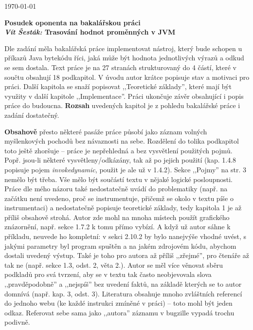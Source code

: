 \documentclass{article}
\begin{document}
\begin{flushright}
\today
\end{flushright}
\begin{center}
\Large\textbf{Posudek oponenta na bakalářskou práci \\
\normalsize%
\textit{Vít Šesták:} Trasování hodnot proměnných v JVM}
\end{center}

Dle zadání měla bakalářská práce implementovat nástroj, který bude schopen u
příkazů Java bytekódu říci, jaká může být hodnota jednotlivých výrazů a odkud
se sem dostala. Text práce je na 27 stranách strukturovaný do 4 částí, které v
součtu obsahují 18 podkapitol. V úvodu autor krátce popisuje stav a motivaci
pro práci. Další kapitola se snaží popisovat ,,Teoretické základy'', které
mají být využity v další kapitole ,,Implementace''. Práci ukončuje závěr
obsahující i popis práce do budoucna. \textbf{Rozsah} uvedených kapitol je z
pohledu bakalářské práce i zadání dostatečný.

\textbf{Obsahově} přesto některé pasáže práce působí jako záznam volných
myšlenkových pochodů bez návaznosti na sebe. Rozdělení do tolika podkapitol
toto ještě zhoršuje -- práce je nepřehledná a bez vysvětlení použitých pojmů.
Popř. jsou-li některé vysvětleny/odkázány, tak až po jejich použití (kap.
1.4.8 popisuje pojem \emph{invokedynamic}, použit je ale už v 1.4.2). Sekce
,,Pojmy'' na str. 3 nemělo být třeba. Vše mělo být součástí textu v nějaké
logické posloupnosti.  Práce dle mého názoru také nedostatečně uvádí do
problematiky (např. na začátku není uvedeno, proč se instrumentuje, přičemž se
okolo v textu píše o instrumentaci) a nedostatečně popisuje teoretické
základy, tedy kapitola 1 je až příliš obsahově strohá. Autor zde mohl na mnoha
místech použít grafického znázornění, např. sekce 1.7.2 k tomu přímo vybízí. A
když už autor sáhne k příkladu, neuvede ho kompletní: v sekci 2.10.2 by bylo
nanejvýše vhodné uvést, s jakými parametry byl program spuštěn a na jakém
zdrojovém kódu, abychom dostali uvedený výstup.  Také je toho pro autora až
příliš ,,zřejmé'', pro čtenáře až tak ne (např. sekce 1.3, odst. 2, věta 2.).
Autor se měl více věnovat sběru podkladů pro svá tvrzení, aby se v textu tak
často neobjevovala slova ,,pravděpodobně'' a ,,nejspíš'' bez uvedení faktů, na
základě kterých se to autor domnívá (např. kap.  3, odst. 3).  Literatura
obsahuje mnoho zvláštních referencí do jednoho webu (ke každé instrukci
zmíněné v práci) -- toto mohl být jeden odkaz. Referovat sebe sama jako
,,autora'' záznamu v bugzille vypadá trochu podivně.
\end{document}

